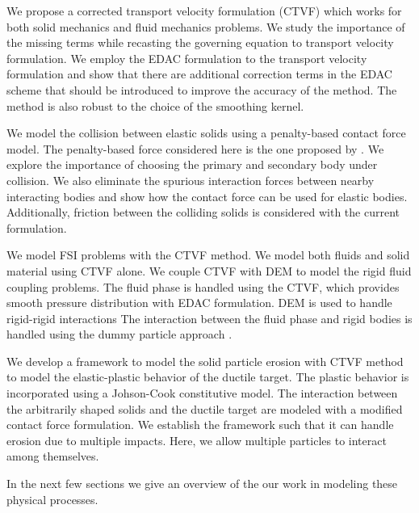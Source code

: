 We propose a corrected transport velocity formulation (CTVF) which works for both
solid mechanics and fluid mechanics problems. We study the importance of the
missing terms while recasting the governing equation to transport velocity
formulation. We employ the EDAC formulation to the transport velocity
formulation and show that there are additional correction terms in the EDAC
scheme that should be introduced to improve the accuracy of the method. The
method is also robust to the choice of the smoothing kernel.

We model the collision between elastic solids using a penalty-based contact
force model. The penalty-based force considered here is the one proposed by
\textcite{mohseni2021particle}. We explore the importance of choosing the
primary and secondary body under collision. We also eliminate the spurious
interaction forces between nearby interacting bodies and show how the contact
force can be used for elastic bodies. Additionally, friction between the
colliding solids is considered with the current formulation.

We model FSI problems with the CTVF method. We model both fluids and solid
material using CTVF alone. We couple CTVF with DEM to model the rigid fluid
coupling problems. The fluid phase is handled using the CTVF, which provides
smooth pressure distribution with EDAC formulation. DEM is used to handle
rigid-rigid interactions The interaction between the fluid phase and rigid
bodies is handled using the dummy particle approach \parencite{Adami2012}.

We develop a framework to model the solid particle erosion with CTVF method to
model the elastic-plastic behavior of the ductile target. The plastic behavior
is incorporated using a Johson-Cook constitutive model. The interaction between
the arbitrarily shaped solids and the ductile target are modeled with a modified
contact force formulation. We establish the framework such that it can handle
erosion due to multiple impacts. Here, we allow multiple particles to interact
among themselves.



In the next few sections we give an overview of the our work in modeling these
physical processes.
